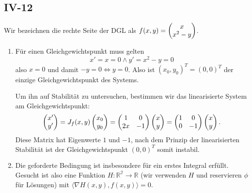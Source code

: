 \documentclass[a4paper]{article}
\begin{document}
\makeexheader

\subsection{IV-12}

Wir bezeichnen die rechte Seite der DGL als $f(x,y) = \left(\begin{matrix}x \\ x^2 - y\end{matrix}\right)$.

\begin{enumerate}
    \item Für einen Gleichgewichtspunkt muss gelten
    \begin{equation*}
        x' = x = 0 \wedge y' = x^2 - y = 0
    \end{equation*}
    also $x = 0$ und damit $-y = 0 \iff y = 0$.
    Also ist $(x_0,y_0)^T = (0,0)^T$ der einzige Gleichgewichtspunkt des Systems.

    Um ihn auf Stabilität zu untersuchen, bestimmen wir das linearisierte System am Gleichgewichtspunkt:
    \begin{equation*}
        \left(\begin{matrix}x' \\ y'\end{matrix}\right) = J_f(x,y) \left(\begin{matrix}x_0 \\ y_0\end{matrix}\right) = \left(\begin{matrix}1 & 0 \\ 2x & -1\end{matrix}\right) \left(\begin{matrix}x \\ y\end{matrix}\right) = \left(\begin{matrix}1 & 0 \\ 0 & -1\end{matrix}\right) \left(\begin{matrix}x \\ y\end{matrix}\right)\text{.}
    \end{equation*}
    Diese Matrix hat Eigenwerte $1$ und $-1$, nach dem Prinzip der linearisierten Stabilität ist der Gleichgewichtspunkt $(0, 0)^T$ somit instabil.
    \item Die geforderte Bedingung ist insbesondere für ein erstes Integral erfüllt.
    Gesucht ist also eine Funktion $H: \mathds{R^2} \to \mathds{R}$ (wir verwenden $H$ und reservieren $\phi$ für Lösungen) mit $\langle \nabla H(x,y), f(x,y)\rangle = 0$.


\end{enumerate}
\end{document}
